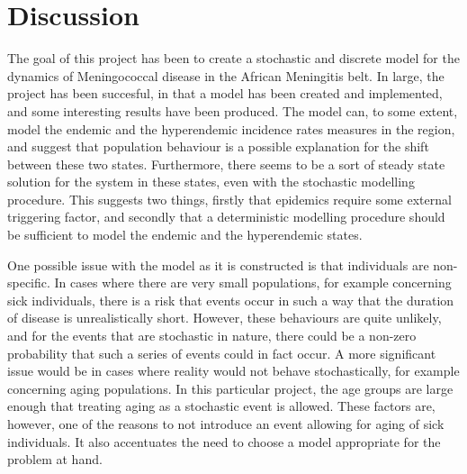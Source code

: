 \documentclass[10pt,a4paper]{article}
\begin{document}



\section{Discussion}

The goal of this project has been to create a stochastic and discrete model for the dynamics of Meningococcal disease in the African Meningitis belt. In large, the project has been succesful, in that a model has been created and implemented, and some interesting results have been produced. The model can, to some extent, model the endemic and the hyperendemic incidence rates measures in the region, and suggest that population behaviour is a possible explanation for the shift between these two states. Furthermore, there seems to be a sort of steady state solution for the system in these states, even with the stochastic modelling procedure. This suggests two things, firstly that epidemics require some external triggering factor, and secondly that a deterministic modelling procedure should be sufficient to model the endemic and the hyperendemic states.

One possible issue with the model as it is constructed is that individuals are non-specific. In cases where there are very small populations, for example concerning sick individuals, there is a risk that events occur in such a way that the duration of disease is unrealistically short. However, these behaviours are quite unlikely, and for the events that are stochastic in nature, there could be a non-zero probability that such a series of events could in fact occur. A more significant issue would be in cases where reality would not behave stochastically, for example concerning aging populations. In this particular project, the age groups are large enough that treating aging as a stochastic event is allowed. These factors are, however, one of the reasons to not introduce an event allowing for aging of sick individuals. It also accentuates the need to choose a model appropriate for the problem at hand.
\end{document}
